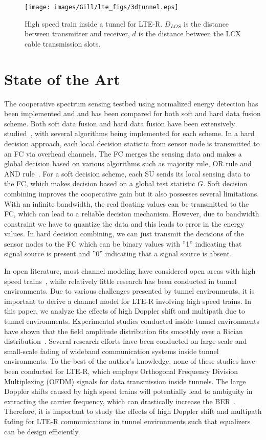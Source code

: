 \begin{figure}[!ht]
\label{fig:ltertunnel}
\centering
\texttt{[image: images/Gill/lte\_figs/3dtunnel.eps]} 
\caption{High speed train inside a tunnel for LTE-R. $D_{LOS}$ is the distance between transmitter and receiver, $d$ is the distance between the LCX cable transmission slots.}
\end{figure}

\section{State of the Art}
The cooperative spectrum sensing testbed using normalized energy detection has been implemented and and has been compared for both soft and hard data fusion scheme. Both soft data fusion and hard data fusion have been extensively studied~\cite{arhtn9,inphtn10,arhtn11}, with several algorithms being implemented for each scheme. In a hard decision approach, each local decision statistic from sensor node is transmitted to an FC via overhead channels. The FC merges the sensing data and makes a global decision based on various algorithms such as majority rule, OR rule and AND rule~\cite{inhtn12}. For a soft decision scheme, each SU sends its local sensing data to the FC, which makes decision based on a global test statistic $G$. Soft decision combining improves the cooperative gain but it also possesses several limitations. With an infinite bandwidth, the real floating values can be transmitted to the FC, which can lead to a reliable decision mechanism. However, due to bandwidth constraint we have to quantize the data and this leads to error in the energy values. In hard decision combining, we can just transmit the decisions of the sensor nodes to the FC which can be binary values with ”1” indicating that signal source is present and ”0” indicating that a signal source is absent.

In open literature, most channel modeling have considered open areas with high speed trains~\cite{inplter5,inplter6}, while relatively little research has been conducted in tunnel environments. Due to various challenges presented by tunnel environments, it is important to derive a channel model for LTE-R involving high speed trains. In this paper, we analyze the effects of high Doppler shift and multipath due to tunnel environments. Experimental studies conducted inside tunnel environments have shown that the field amplitude distribution fits smoothly over a Rician distribution~\cite{inplter8}. Several research efforts have been conducted on large-scale and small-scale fading of wideband communication systems inside tunnel environments. To the best of the author’s knowledge, none of these studies have been conducted for LTE-R, which employs Orthogonal Frequency Division Multiplexing (OFDM) signals for data transmission inside tunnels. The large Doppler shifts caused by high speed trains will potentially lead to ambiguity in extracting the carrier frequency, which can drastically increase the BER~\cite{inplter9}. Therefore, it is important to study the effects of high Doppler shift and multipath fading for LTE-R communications in tunnel environments such that equalizers can be design efficiently.

